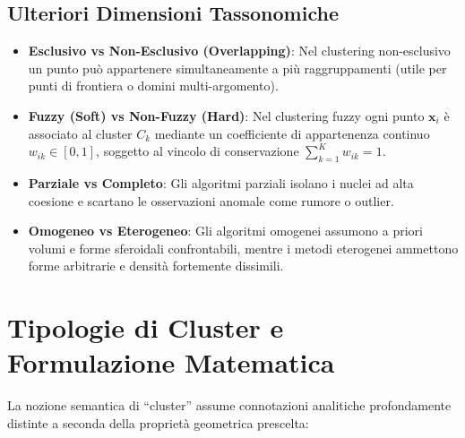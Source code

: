 \subsection{Ulteriori Dimensioni Tassonomiche}
\begin{itemize}
    \item \textbf{Esclusivo vs Non-Esclusivo (Overlapping)}: Nel clustering non-esclusivo un punto può appartenere simultaneamente a più raggruppamenti (utile per punti di frontiera o domini multi-argomento).
    \item \textbf{Fuzzy (Soft) vs Non-Fuzzy (Hard)}: Nel clustering fuzzy ogni punto $\mathbf{x}_i$ è associato al cluster $C_k$ mediante un coefficiente di appartenenza continuo $w_{ik} \in [0, 1]$, soggetto al vincolo di conservazione $\sum_{k=1}^K w_{ik} = 1$.
    \item \textbf{Parziale vs Completo}: Gli algoritmi parziali isolano i nuclei ad alta coesione e scartano le osservazioni anomale come rumore o outlier.
    \item \textbf{Omogeneo vs Eterogeneo}: Gli algoritmi omogenei assumono a priori volumi e forme sferoidali confrontabili, mentre i metodi eterogenei ammettono forme arbitrarie e densità fortemente dissimili.
\end{itemize}

\section{Tipologie di Cluster e Formulazione Matematica}
\label{sec:dm-cluster-types-definitions}

La nozione semantica di ``cluster'' assume connotazioni analitiche profondamente distinte a seconda della proprietà geometrica prescelta:


